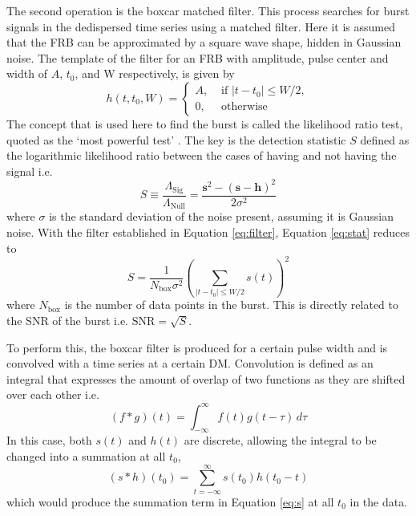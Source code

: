The second operation is the boxcar matched filter. This process searches for burst signals in the dedispersed time series using a matched filter. Here it is assumed that the FRB can be approximated by a square wave shape, hidden in Gaussian noise. The template of the filter for an FRB with amplitude, pulse center and width of $A$, $t_0$, and W respectively, is given by
\begin{equation} \label{eq:filter}
    h(t,t_0,W) = \begin{cases}A, &\text{ if } \left|t-t_0\right| \leq W/2, \\
    0, &\text{ otherwise}\end{cases}
\end{equation}
The concept that is used here to find the burst is called the likelihood ratio test, quoted as the `most powerful test' \cite{fisz1963probability}. The key is the detection statistic $S$ defined as the logarithmic likelihood ratio between the cases of having and not having the signal i.e.
\begin{equation}\label{eq:stat}
    S \equiv \frac{\Lambda_{\text{Sig}}}{\Lambda_{\text{Null}}} = \frac{\mathbf{s}^2 - (\mathbf{s}-\mathbf{h})^2}{2\sigma^2}
\end{equation}
where $\sigma$ is the standard deviation of the noise present, assuming it is Gaussian noise. With the filter established in Equation \ref{eq:filter}, Equation \ref{eq:stat} reduces to 
\begin{equation}\label{eq:s}
    S = \frac{1}{N_{\text{box}}\sigma^2} \left(\sum_{\left|t-t_0\right|\leq W/2} s(t)\right)^2
\end{equation}
where $N_{\text{box}}$ is the number of data points in the burst. This is directly related to the SNR of the burst i.e. $\text{SNR} = \sqrt{S}$. 

To perform this, the boxcar filter is produced for a certain pulse width and is convolved with a time series at a certain DM. Convolution is defined as an integral that expresses the amount of overlap of two functions as they are shifted over each other i.e.
\begin{equation}
    (f*g)(t) = \int_{-\infty}^{\infty} f(t)g(t-\tau)\,d\tau
\end{equation}
In this case, both $s(t)$ and $h(t)$ are discrete, allowing the integral to be changed into a summation at all $t_0$,
\begin{equation}
    (s*h)(t_0) = \sum_{t = -\infty}^{\infty} s(t_0)h(t_0-t)
\end{equation}
which would produce the summation term in Equation \ref{eq:s} at all $t_0$ in the data.


